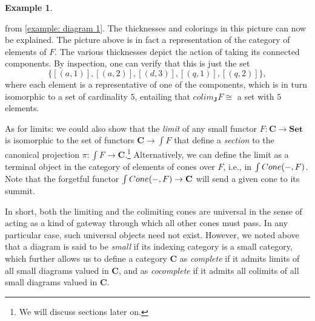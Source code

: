 \documentclass[11pt]{book}
\theoremstyle{definition}
\newtheorem{example}{Example}[section]
\theoremstyle{definition}
\theoremstyle{definition}
\theoremstyle{theorem}
\theoremstyle{definition}
\begin{document}
\begin{example}
\begin{center}
	\end{center} 
from \ref{example: diagram 1}.
The thicknesses and colorings in this picture can now be explained. The picture above is in fact a representation of the category of elements of $F$. The various thicknesses depict the action of taking its connected components. By inspection, one can verify that this is just the set 
\begin{equation*} \{[(a,1)], [(a,2)], [(d,3)], [(q,1)], [(q,2)]\},
\end{equation*} 
where each element is a representative of one of the components, which is in turn isomorphic to a set of cardinality $5$, entailing that $colim_{\textbf{J}} F \cong$ a set with $5$ elements. \par 
As for limits: we could also show that the \textit{limit} of any small functor $F: \textbf{C} \rightarrow \textbf{Set}$ is isomorphic to the set of functors $\textbf{C} \rightarrow \int F$ that define a \textit{section} to the canonical projection $\pi: \int F \rightarrow \textbf{C}$.\footnote{We will discuss sections later on.} Alternatively, we can define the limit as a terminal object in the category of elements of cones over $F$, i.e., in $\int Cone(\--,F)$. Note that the forgetful functor $\int Cone(\--, F) \rightarrow \textbf{C}$ will send a given cone to its summit. \par 
 In short, both the limiting and the colimiting cones are universal in the sense of acting as a kind of gateway through which all other cones must pass. In any particular case, such universal objects need not exist. However, we noted above that a diagram is said to be \textit{small} if its indexing category is a small category, which further allows us to define a category $\textbf{C}$ as \textit{complete}  if it admits limits of all small diagrams valued in \textbf{C}, and as \textit{cocomplete}  if it admits all colimits of all small diagrams valued in \textbf{C}.      
\end{example}
\end{document}
